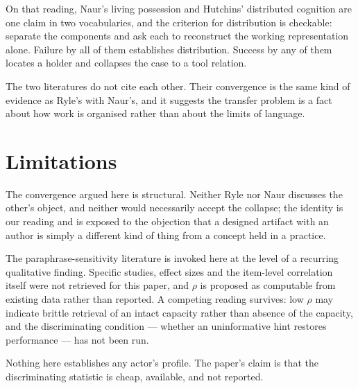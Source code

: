 \documentclass[11pt,a4paper]{article}
\begin{document}
On that reading, Naur's living possession and Hutchins' distributed cognition are one claim in two vocabularies, and the criterion for distribution is checkable: separate the components and ask each to reconstruct the working representation alone. Failure by all of them establishes distribution. Success by any of them locates a holder and collapses the case to a tool relation.

The two literatures do not cite each other. Their convergence is the same kind of evidence as Ryle's with Naur's, and it suggests the transfer problem is a fact about how work is organised rather than about the limits of language.

\section{Limitations}
The convergence argued here is structural. Neither Ryle nor Naur discusses the other's object, and neither would necessarily accept the collapse; the identity is our reading and is exposed to the objection that a designed artifact with an author is simply a different kind of thing from a concept held in a practice.

The paraphrase-sensitivity literature is invoked here at the level of a recurring qualitative finding. Specific studies, effect sizes and the item-level correlation itself were not retrieved for this paper, and $\rho$ is proposed as computable from existing data rather than reported. A competing reading survives: low $\rho$ may indicate brittle retrieval of an intact capacity rather than absence of the capacity, and the discriminating condition --- whether an uninformative hint restores performance --- has not been run.

Nothing here establishes any actor's profile. The paper's claim is that the discriminating statistic is cheap, available, and not reported.
\end{document}

